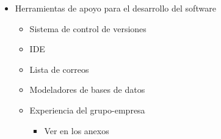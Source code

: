 \documentclass[12pt]{article}
\numberwithin{equation}{section}
\numberwithin{figure}{section}
\numberwithin{table}{section}
\begin{document}
\begin{itemize}
\item Herramientas de apoyo para el desarrollo del software
\begin{itemize}
\item Sistema de control de versiones
\item IDE 
\item Lista de correos 
\item Modeladores de bases de datos
\end{itemize} 

\begin{itemize}
\item Experiencia del grupo-empresa
\begin{itemize}
\item Ver en los anexos
\end{itemize} 
\end{itemize}

\end{itemize}



\end{document}
